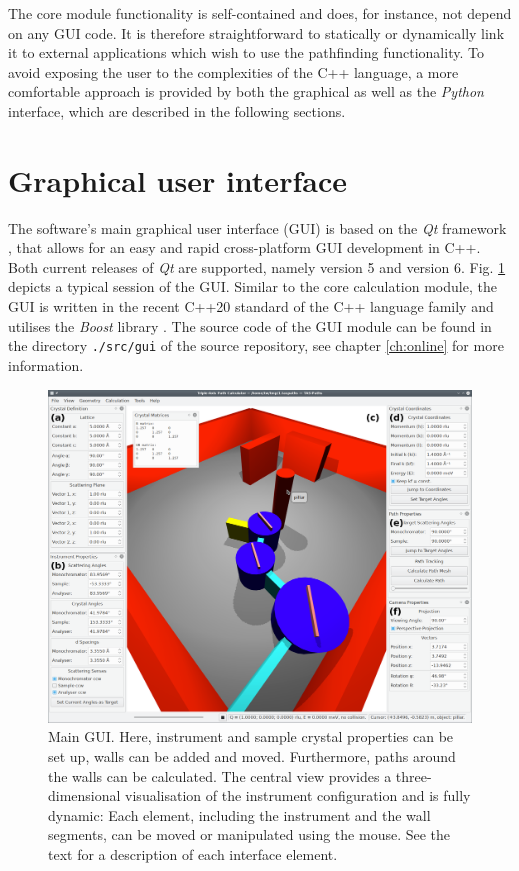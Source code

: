 The core module functionality is self-contained and does, for instance, not depend on any GUI code.
It is therefore straightforward to statically or dynamically link it to external applications which 
wish to use the pathfinding functionality. To avoid exposing the user to the complexities of
the C++ language, a more comfortable approach is provided by both the graphical as well 
as the \textit{Python} interface, which are described in the following sections.



\section{Graphical user interface}
\label{sec:gui}
The software's main graphical user interface (GUI) is based on the \textit{Qt} framework 
\cite{web_Qt}, that allows for an easy and rapid cross-platform GUI development in C++. 
Both current releases of \textit{Qt} are supported, namely version 5 and version 6.
Fig. \ref{fig:gui} depicts a typical session of the GUI.
Similar to the core calculation module, the GUI is written in the recent C++20
standard \cite{ISOCPP20} of the C++ language family \cite{Stroustrup2008, Stroustrup2018}
and utilises the \textit{Boost} library \cite{web_boost}.
The source code of the GUI module can be found in the directory \lstinline|./src/gui| of the
source repository, see chapter \ref{ch:online} for more information.

\begin{figure}[htb]
		\begin{center}
			\includegraphics[width = 1 \textwidth]{figures/gui}
		\end{center}
	\caption[Main program GUI.]{Main GUI. 
		Here, instrument and sample crystal properties can be set up,
		walls can be added and moved. 
		Furthermore, paths around the walls can be calculated.
		The central view provides a three-dimensional visualisation of the instrument
		configuration and is fully dynamic: Each element, including the instrument
		and the wall segments, can be moved or manipulated using the mouse.
		See the text for a description of each interface element.
		\label{fig:gui}}
\end{figure}

